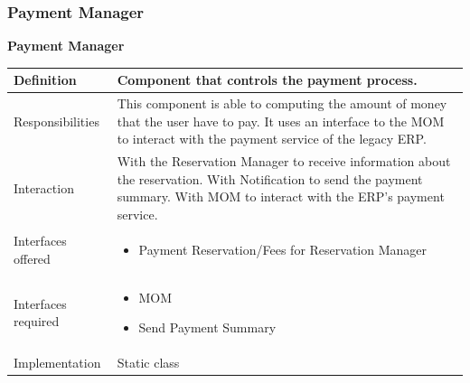 \documentclass{article}
\begin{document}
			\subsubsection{Payment Manager}
			\begin{minipage}{\linewidth}
			\end{minipage}
			\begin{center}
				\centerline{\textbf{Payment Manager}}	
				\begin{tabular}{| l | p{9cm} |}\hline
					Definition & Component that controls the payment process.\\\hline
					Responsibilities & This component is able to computing the amount of money that the user have to pay. It uses an interface to the MOM to interact with the payment service of the legacy ERP.\\\hline
					Interaction & With the Reservation Manager to receive information about the reservation. With Notification to send the payment summary. With MOM to interact with the ERP's payment service.\\\hline
					Interfaces offered & \begin{itemize}
						\item Payment Reservation/Fees for Reservation Manager
					\end{itemize}\\\hline
					Interfaces required & \begin{itemize}
						\item MOM
						\item Send Payment Summary
					\end{itemize}\\\hline
					Implementation & Static class\\\hline
				\end{tabular}
			\end{center}
			
\end{document}
